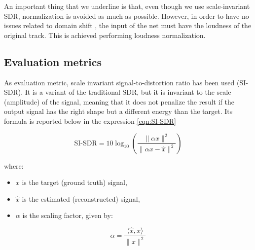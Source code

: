 \documentclass{article}
\begin{document}
\begin{sloppy}
An important thing that we underline is that, even though we use scale-invariant SDR, normalization is avoided as much as possible. However, in order to have no issues related to domain shift \cite{zhang2013domain}, the input of the net must have the loudness of the original track. This is achieved performing loudness normalization. %




\subsection{Evaluation metrics}
\label{ev_metrics}
As evaluation metric, scale invariant signal-to-distortion ratio has been used (SI-SDR). It is a variant of the traditional SDR, but it is invariant to the scale (amplitude) of the signal, meaning that it does not penalize the result if the output signal has the right shape but a different energy than the target. Its formula is reported below in the expression \ref{eqn:SI-SDR}

\begin{equation}
  \label{eqn:SI-SDR}
    \text{SI-SDR} = 10 \log_{10} \left( \frac{ \| \alpha x \|^2 }{ \| \alpha x - \hat{x} \|^2 } \right)
\end{equation}
    
where:
\begin{itemize}
    \item \( x \) is the target (ground truth) signal,
    \item \( \hat{x} \) is the estimated (reconstructed) signal,
    \item \( \alpha \) is the scaling factor, given by:
\end{itemize}

\begin{equation}
\label{eqn:scaling_factor}
\alpha = \frac{ \langle \hat{x}, x \rangle }{ \| x \|^2 }
\end{equation}


\end{sloppy}
\end{document}
